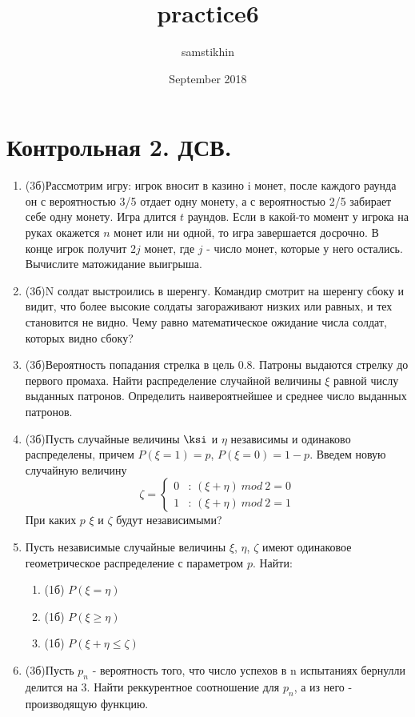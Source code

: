 \documentclass[a4paper, 14pt]{extarticle}
\title{practice6}
\author{samstikhin}
\date{September 2018}
\begin{document}
\section*{Контрольная 2. ДСВ.}
\begin{enumerate}
\item (3б)Рассмотрим игру: игрок вносит в казино i монет, после каждого раунда он с вероятностью 3/5 отдает одну монету, а с вероятностью 2/5 забирает себе одну монету. Игра длится $t$ раундов. Если в какой-то момент у игрока на руках окажется $n$ монет или ни одной, то игра завершается досрочно. В конце игрок получит $2j$ монет, где $j$ - число монет, которые у него остались. Вычислите матожидание выигрыша.
\item (3б)N солдат выстроились в шеренгу. Командир смотрит на шеренгу сбоку и видит, что более высокие солдаты загораживают низких или равных, и тех становится не видно. Чему равно математическое ожидание числа солдат, которых видно сбоку?

	\item (3б)Вероятность попадания стрелка в цель 0.8. Патроны выдаются стрелку до первого промаха. Найти распределение случайной величины $\xi$ равной числу выданных патронов. Определить наивероятнейшее и среднее число выданных патронов.
	\item (3б)Пусть случайные величины $\ksi$ и $\eta$ независимы и одинаково распределены, причем $P(\xi = 1) = p$, $P(\xi = 0) = 1-p$. Введем новую случайную величину $$\zeta = \begin{cases} 0& \text{: $(\xi + \eta) ~mod ~2 = 0$} \\ 1& \text{: $(\xi+\eta) ~mod ~2 = 1$} \end{cases}$$
	При каких $p$ $\xi$ и $\zeta$ будут независимыми?
	\item Пусть независимые случайные величины $\xi$, $\eta$, $\zeta$ имеют одинаковое геометрическое распределение с параметром $p$. Найти:
	\begin{enumerate}
	    \item (1б) $P(\xi=\eta)$
	    \item (1б) $P(\xi\geq\eta)$
	    \item (1б) $P(\xi+\eta\leq\zeta)$
	\end{enumerate}
	\item (3б)Пусть $p_n$ - вероятность того, что число успехов в n испытаниях бернулли делится на 3. Найти реккурентное соотношение для $p_n$, а из него - производящую функцию.




\end{enumerate}
\end{document}
